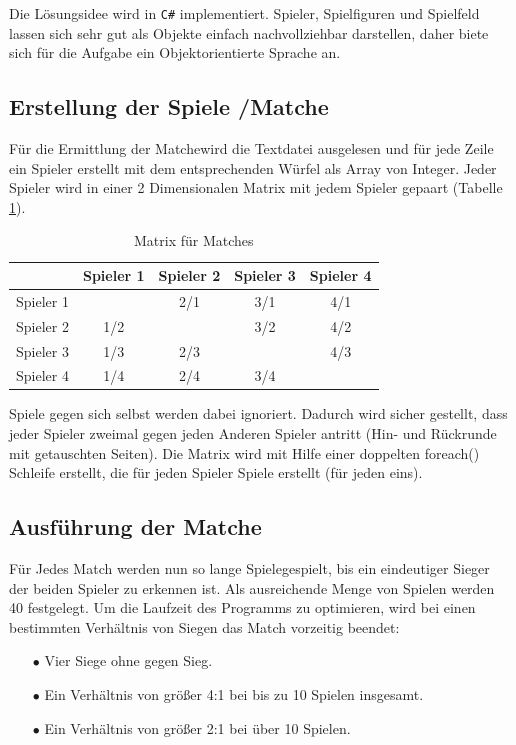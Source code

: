 \documentclass[a4paper,11pt,ngerman]{scrartcl}
\begin{document}
Die Lösungsidee wird in \texttt{C\#} implementiert. Spieler, Spielfiguren und Spielfeld lassen sich sehr gut als Objekte einfach nachvollziehbar darstellen, daher biete sich für die Aufgabe ein Objektorientierte Sprache an.
\subsection{Erstellung der Spiele /\glqq Matche\grqq} 
Für die Ermittlung der \glqq Matche\grqq wird die Textdatei ausgelesen und für jede Zeile ein Spieler erstellt mit dem entsprechenden Würfel als Array von Integer. Jeder Spieler wird in einer 2 Dimensionalen Matrix mit jedem Spieler gepaart (Tabelle \ref{table:Matrix}).
\begin{table}	
	\centering
	\begin{tabular}{|c|c|c|c|c|}	
		\hline
		& Spieler 1 & Spieler 2 & Spieler 3 & Spieler 4\\
		\hline
		Spieler 1 &\cellcolor{mygray}& 2/1 & 3/1 & 4/1 \\	
		\hline
		Spieler 2 & 1/2 & \cellcolor{mygray} & 3/2 & 4/2 \\
		\hline
		Spieler 3 & 1/3 & 2/3 &\cellcolor{mygray}& 4/3 \\
		\hline
		Spieler 4 & 1/4 & 2/4 & 3/4 & \cellcolor{mygray} \\
		\hline
	\end{tabular}
	\caption{Matrix für Matches}
	\label{table:Matrix}
\end{table}
Spiele gegen sich selbst werden dabei ignoriert. Dadurch wird sicher gestellt, dass jeder Spieler zweimal gegen jeden Anderen Spieler antritt (Hin- und Rückrunde mit getauschten Seiten). Die Matrix wird mit Hilfe einer doppelten foreach() Schleife erstellt, die für jeden Spieler Spiele erstellt (für jeden eins).
\subsection{Ausführung der \glqq Matche\grqq}
Für Jedes Match werden nun so lange \glqq Spiele\grqq \space gespielt, bis ein eindeutiger Sieger der beiden Spieler zu erkennen ist. Als ausreichende Menge von Spielen werden 40 festgelegt. Um die Laufzeit des Programms zu optimieren, wird bei einen bestimmten Verhältnis von Siegen das Match vorzeitig beendet:
\begin{enumerate}
	\item[$\bullet$] Vier Siege ohne gegen Sieg.	
	\item[$\bullet$] Ein Verhältnis von größer 4:1 bei bis zu 10 Spielen insgesamt.
	\item[$\bullet$] Ein Verhältnis von größer 2:1 bei über 10 Spielen. 
\end{enumerate}
\end{document}
